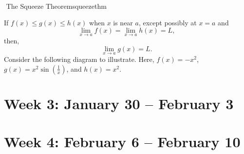         \begin{theorem}{\Stop\,\,The Squeeze Theorem}{squeezethm}

            If \(f(x)\leq g(x)\leq h(x)\) when \(x\) is near \(a\), except possibly at \(x=a\) and
            \begin{equation*}
                \lim_{x\to a}f(x)=\lim_{x\to a}h(x)=L,
            \end{equation*}
            then,
            \begin{equation*}
                \lim_{x\to a}g(x)=L.
            \end{equation*}
            Consider the following diagram to illustrate. Here, \(f(x)=-x^2\), \(g(x)=x^2\sin\left(\frac{1}{x}\right)\), and \(h(x)=x^2\).
            \begin{center}
            \end{center}
            
        \end{theorem}

\section{Week 3: January 30 -- February 3}

\section{Week 4: February 6 -- February 10}